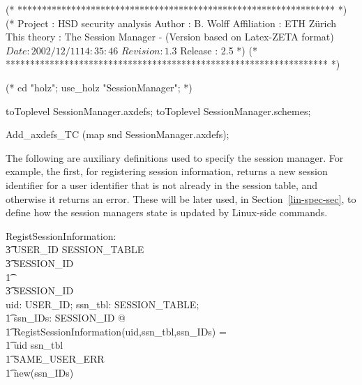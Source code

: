 \documentclass[a4paper,pdftex]{article}
\newenvironment{holz-ml}{\comment}{\endcomment}
\begin{document}
\begin{holz-ml}

(* ***************************************************************** *)
(*      Project         : HSD security analysis
        Author          : B. Wolff
        Affiliation     : ETH Z\"urich
        This theory     : The Session Manager - 
                          (Version based on Latex-ZETA format)
        $Date: 2002/12/11 14:35:46 $
        $Revision: 1.3 $
        Release         : 2.5                                         *)
(* ****************************************************************** *)

(* cd "holz"; 
   use_holz "SessionManager";
*)


toToplevel SessionManager.axdefs;
toToplevel SessionManager.schemes;

Add_axdefs_TC (map snd SessionManager.axdefs);


\end{holz-ml}

The following are auxiliary definitions used to specify the session
manager.  For example, the first, for registering session information,
returns a new session identifier for a user identifier that is not
already in the session table, and otherwise it returns an error.  These will
be later used, in Section~\ref{lin-spec-sec}, to define how the session
managers state is updated by Linux-side commands.

\begin{axdef}
RegistSessionInformation: \\
\t3 USER\_ID \cross  SESSION\_TABLE \cross \\
\t3 \finset SESSION\_ID \\
\t1 \fun \\
\t3 SESSION\_ID \\
  \where
  \forall uid: USER\_ID; ssn\_tbl: SESSION\_TABLE; \\
\t1 ssn\_IDs: \finset SESSION\_ID  @ \\
\t1 RegistSessionInformation(uid,ssn\_tbl,ssn\_IDs) = \\
\t1 \IF  uid \in \dom ssn\_tbl \\
\t1 \THEN SAME\_USER\_ERR \\
\t1 \ELSE new(ssn\_IDs)
\end{axdef}


\end{document}
